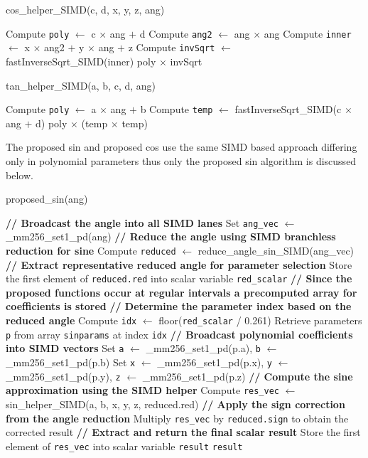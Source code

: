 \documentclass[12pt,twoside, letterpaper, margin=1in]{article}
\begin{document}
\begin{algorithm}[H]
\caption{cos\_helper\_SIMD(c, d, x, y, z, ang)}
%
Compute \texttt{poly} $\gets$ c $\times$ ang $+$ d\;
Compute \texttt{ang2} $\gets$ ang $\times$ ang\;
Compute \texttt{inner} $\gets$ x $\times$ ang2 $+$ y $\times$ ang $+$ z\;
Compute \texttt{invSqrt} $\gets$ fastInverseSqrt\_SIMD(inner)\;
%
\Return poly $\times$ invSqrt\;
\end{algorithm}


\begin{algorithm}[H]
\caption{tan\_helper\_SIMD(a, b, c, d, ang)}
%
Compute \texttt{poly} $\gets$ a $\times$ ang $+$ b\;
Compute \texttt{temp} $\gets$ fastInverseSqrt\_SIMD(c $\times$ ang $+$ d)\;
%
\Return poly $\times$ (temp $\times$ temp)\;
\end{algorithm}
The proposed sin and proposed cos use the same SIMD based approach differing only in polynomial parameters thus only the proposed sin algorithm is discussed below.\\

\begin{algorithm}[H]
\caption{proposed\_sin(ang)}
%
\textbf{// Broadcast the angle into all SIMD lanes}\;
Set \texttt{ang\_vec} $\gets$ \_mm256\_set1\_pd(ang)\;
%
\textbf{// Reduce the angle using SIMD branchless reduction for sine}\;
Compute \texttt{reduced} $\gets$ reduce\_angle\_sin\_SIMD(ang\_vec)\;
%
\textbf{// Extract representative reduced angle for parameter selection}\;
Store the first element of \texttt{reduced.red} into scalar variable \texttt{red\_scalar}\;
%
\textbf{// Since the proposed functions occur at regular intervals a precomputed array for coefficients is stored}\;
\textbf{// Determine the parameter index based on the reduced angle}\;
Compute \texttt{idx} $\gets$ floor(\texttt{red\_scalar} / 0.261)\;
Retrieve parameters \texttt{p} from array \texttt{sinparams} at index \texttt{idx}\;
%
\textbf{// Broadcast polynomial coefficients into SIMD vectors}\;
Set \texttt{a} $\gets$ \_mm256\_set1\_pd(p.a), \quad \texttt{b} $\gets$ \_mm256\_set1\_pd(p.b)\;
Set \texttt{x} $\gets$ \_mm256\_set1\_pd(p.x), \quad \texttt{y} $\gets$ \_mm256\_set1\_pd(p.y), \quad \texttt{z} $\gets$ \_mm256\_set1\_pd(p.z)\;
%
\textbf{// Compute the sine approximation using the SIMD helper}\;
Compute \texttt{res\_vec} $\gets$ sin\_helper\_SIMD(a, b, x, y, z, reduced.red)\;
%
\textbf{// Apply the sign correction from the angle reduction}\;
Multiply \texttt{res\_vec} by \texttt{reduced.sign} to obtain the corrected result\;
%
\textbf{// Extract and return the final scalar result}\;
Store the first element of \texttt{res\_vec} into scalar variable \texttt{result}\;
\Return \texttt{result}\;
\end{algorithm}
\end{document}
